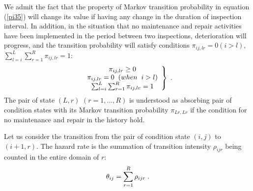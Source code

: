 We admit the fact that the property of Markov transition probability in equation (\ref{pi35}) will change its value if having any change in the duration of inspection interval. In addition, in the situation that no maintenance and repair activities have been implemented in the period between two inspections, deterioration will progress, and the transition probability will satisfy conditions $\pi_{ij,lr}=0 (i > l)$, $\sum\nolimits_{l = i}^L {\sum\nolimits_{r = 1}^R {\pi _{ij,lr} } }  = 1$:
%
\begin{eqnarray}
\begin{array}{l}
  \left. {\begin{array}{*{20}c}
   {\pi _{ij,lr}  \ge 0}  \\
   {\pi _{ij,lr}  = 0 \hspace{2mm} (when \hspace{2mm} i > l)} \\
   {\sum\nolimits_{l = i}^L {\sum\nolimits_{r = 1}^R {\pi _{ij,lr} } }  = 1}  \\
\end{array}} \right\} \hspace{1mm}.\\ 
 \end{array} \label{pt36}
\end{eqnarray}
The pair of state $(L,r)$ $(r=1,...,R)$ is understood as absorbing pair of condition states with its Markov transition probability $\pi _{Lr,Lr}$ if the condition for no maintenance and repair in the history hold.

Let us consider the transition from the pair of condition state $(i,j)$ to $(i+1,r)$. The hazard rate is the summation of transition intensity $\rho _{ijr}$ being counted in the entire domain of $r$:
\begin{eqnarray}
\theta _{ij}  = \sum\limits_{r = 1}^R {\rho _{ijr} } \hspace{1mm}.\label{tranintent}
\end{eqnarray}
